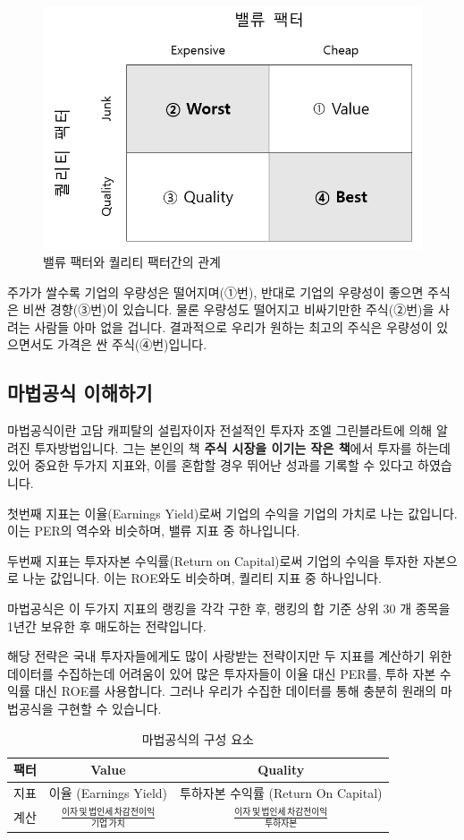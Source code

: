 \documentclass[12pt,]{book}
\begin{document}
\begin{figure}[h]

{\centering \includegraphics[width=0.5\linewidth]{images/tableqv} 

}

\caption{밸류 팩터와 퀄리티 팩터간의 관계}\label{fig:unnamed-chunk-9}
\end{figure}

주가가 쌀수록 기업의 우량성은 떨어지며(①번), 반대로 기업의 우량성이 좋으면 주식은 비싼 경향(③번)이 있습니다. 물론 우량성도 떨어지고 비싸기만한 주식(②번)을 사려는 사람들 아마 없을 겁니다. 결과적으로 우리가 원하는 최고의 주식은 우량성이 있으면서도 가격은 싼 주식(④번)입니다.

\hypertarget{section-63}{%
\subsection{마법공식 이해하기}\label{section-63}}

마법공식이란 고담 캐피탈의 설립자이자 전설적인 투자자 조엘 그린블라트에 의해 알려진 투자방법입니다. 그는 본인의 책 \textbf{주식 시장을 이기는 작은 책}에서 투자를 하는데 있어 중요한 두가지 지표와, 이를 혼합할 경우 뛰어난 성과를 기록할 수 있다고 하였습니다.

첫번째 지표는 이율(Earnings Yield)로써 기업의 수익을 기업의 가치로 나는 값입니다. 이는 PER의 역수와 비슷하며, 밸류 지표 중 하나입니다.

두번째 지표는 투자자본 수익률(Return on Capital)로써 기업의 수익을 투자한 자본으로 나눈 값입니다. 이는 ROE와도 비슷하며, 퀄리티 지표 중 하나입니다.

마법공식은 이 두가지 지표의 랭킹을 각각 구한 후, 랭킹의 합 기준 상위 30 개 종목을 1년간 보유한 후 매도하는 전략입니다.

해당 전략은 국내 투자자들에게도 많이 사랑받는 전략이지만 두 지표를 계산하기 위한 데이터를 수집하는데 어려움이 있어 많은 투자자들이 이율 대신 PER를, 투하 자본 수익률 대신 ROE를 사용합니다. 그러나 우리가 수집한 데이터를 통해 충분히 원래의 마법공식을 구현할 수 있습니다.

\begin{table}[!h]

\caption{\label{tab:unnamed-chunk-10}마법공식의 구성 요소}
\centering
\begin{tabular}{ccc}
\toprule
팩터 & Value & Quality\\
\midrule
\rowcolor{gray!6}  지표 & 이율 (Earnings Yield) & 투하자본 수익률 (Return On Capital)\\
계산 & $\frac{이자\,및\,법인세\,차감전이익}{기업\,가치}$ & $\frac{이자\,및\,법인세\,차감전이익}{투하자본}$\\
\bottomrule
\end{tabular}
\end{table}
\end{document}
